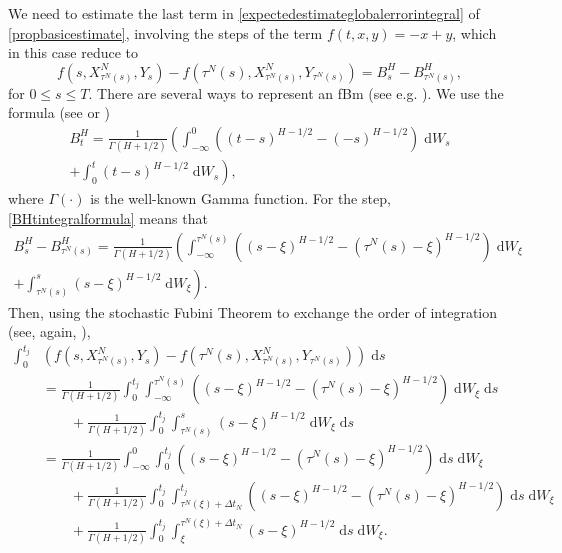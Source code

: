 \documentclass[reqno,12pt]{amsart}
\theoremstyle{plain} %
\theoremstyle{definition} %
\begin{document}
We need to estimate the last term in \eqref{expectedestimateglobalerrorintegral} of \cref{propbasicestimate}, involving the steps of the term $f(t, x, y) = -x + y$, which in this case reduce to
\begin{equation}
    \label{stepfBm}
    f(s, X_{\tau^N(s)}^N, Y_s) - f(\tau^N(s), X_{\tau^N(s)}^N, Y_{\tau^N(s)}) = B^H_s - B^H_{\tau^N(s)},
\end{equation}
for $0 \leq s \leq T$. There are several ways to represent an fBm (see e.g. \cite{BHOB2008, Mishura2008}). We use the formula (see \cite[eq. (2.1)]{MandelbrotVanNess1968} or \cite[eq. (1.1)]{BHOB2008})
\begin{multline}
    \label{BHtintegralformula}
    B^H_t = \frac{1}{\Gamma(H + 1/2)}\left(\int_{-\infty}^0 \left( (t-s)^{H-1/2} - (-s)^{H-1/2}\right) \;\mathrm{d}W_s \right. \\
    \left. + \int_0^t (t - s)^{H-1/2} \;\mathrm{d}W_s\right),
\end{multline}
where $\Gamma(\cdot)$ is the well-known Gamma function. For the step, \eqref{BHtintegralformula} means that
\begin{multline}
    \label{BHtintegralformulastep}
    B^H_s - B^H_{\tau^N(s)} = \frac{1}{\Gamma(H + 1/2)}\left(\int_{-\infty}^{\tau^N(s)} \left( (s-\xi)^{H-1/2} - (\tau^N(s)-\xi)^{H-1/2}\right) \;\mathrm{d}W_\xi \right. \\
    \left. + \int_{\tau^N(s)}^s (s - \xi)^{H-1/2} \;\mathrm{d}W_\xi\right).
\end{multline}
Then, using the stochastic Fubini Theorem to exchange the order of integration (see, again, \cite[Section IV.6]{Protter2005}),
\begin{equation}
    \label{integralofstepfBm}
    \begin{aligned}
        \int_0^{t_j} & \left( f(s, X_{\tau^N(s)}^N, Y_s) - f(\tau^N(s), X_{\tau^N(s)}^N, Y_{\tau^N(s)}) \right)\;\mathrm{d}s \\
        & = \frac{1}{\Gamma(H + 1/2)}\int_0^{t_j} \int_{-\infty}^{\tau^N(s)} \left( (s-\xi)^{H-1/2} - (\tau^N(s)-\xi)^{H-1/2}\right) \;\mathrm{d}W_\xi \;\mathrm{d}s \\
        & \qquad + \frac{1}{\Gamma(H + 1/2)}\int_0^{t_j} \int_{\tau^N(s)}^s (s - \xi)^{H-1/2} \;\mathrm{d}W_\xi \;\mathrm{d}s \\
        & = \frac{1}{\Gamma(H + 1/2)}\int_{-\infty}^{0} \int_{0}^{t_j} \left( (s-\xi)^{H-1/2} - (\tau^N(s)-\xi)^{H-1/2}\right) \;\mathrm{d}s \;\mathrm{d}W_\xi \\
        & \qquad + \frac{1}{\Gamma(H + 1/2)}\int_{0}^{t_j} \int_{\tau^N(\xi)+\Delta t_N}^{t_j} \left( (s-\xi)^{H-1/2} - (\tau^N(s)-\xi)^{H-1/2}\right)  \;\mathrm{d}s \;\mathrm{d}W_\xi\\
        & \qquad + \frac{1}{\Gamma(H + 1/2)}\int_0^{t_j} \int_\xi^{\tau^N(\xi) + \Delta t_N} (s - \xi)^{H-1/2} \;\mathrm{d}s \;\mathrm{d}W_\xi. \\
    \end{aligned}
\end{equation}
\end{document}
